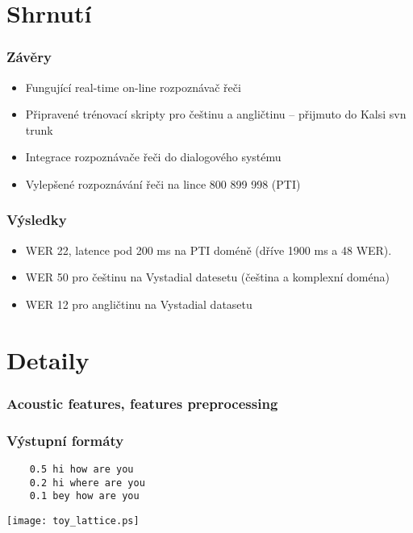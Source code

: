 \section{Shrnutí} %

\begin{frame}\frametitle{Závěry} 
    \begin{itemize}
        \item Fungující real-time on-line rozpoznávač řeči
        \item Připravené trénovací skripty pro češtinu a angličtinu -- přijmuto do Kalsi svn trunk
        \item Integrace rozpoznávače řeči do dialogového systému
        \item Vylepšené rozpoznávání řeči na lince 800 899 998 (PTI)
    \end{itemize}
\end{frame}

\begin{frame}\frametitle{Výsledky} 
    \begin{itemize}
        \item WER 22, latence pod 200 ms na PTI doméně (dříve 1900 ms a 48 WER). 
        \item WER 50 pro češtinu na Vystadial datesetu (čeština a komplexní doména)
        \item WER 12 pro angličtinu na Vystadial datasetu 
    \end{itemize}
\end{frame}


\section{Detaily} %

\begin{frame}\frametitle{Acoustic features, features preprocessing} 
    
    
\end{frame}

\begin{frame}[fragile]\frametitle{Výstupní formáty} 

    \begin{verbatim}
    0.5 hi how are you
    0.2 hi where are you
    0.1 bey how are you
\end{verbatim}

    \begin{center}
        \texttt{[image: toy\_lattice.ps]}
    \end{center}
\end{frame}


